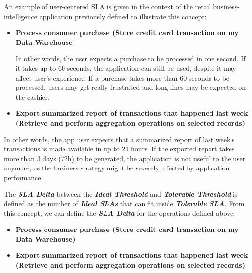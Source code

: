 An example of user-centered SLA is given in the context of the retail business-intelligence application previously defined to illustrate this concept: 

\begin{itemize}
\item{ 
\textbf{Process consumer purchase (Store credit card transaction on my Data Warehouse}
}

In other words, the user expects a purchase to be processed in one second. If it takes up to 60 seconds, the application can still be used, despite it may affect user's experience. If a purchase takes more than 60 seconds to be processed, users may get really frustrated and long lines may be expected on the cashier.

\item{
\textbf{Export summarized report of transactions that happened last week (Retrieve and perform aggregation operations on selected records) }
}
\end{itemize}
     
In other words, the app user expects that a summarized report of last week's transactions is made available in up to 24 hours. If the exported report takes more than 3 days (72h) to be generated, the application is not useful to the user anymore, as the business strategy might be severely affected by application performance.

The \textbf{\textit{SLA Delta}} between the \textbf{\textit{Ideal Threshold}} and \textbf{\textit{Tolerable Threshold}} is defined as the number of \textbf{\textit{Ideal SLAs}} that can fit inside \textbf{\textit{Tolerable SLA}}. From this concept, we can define the \textbf{\textit{SLA Delta}} for the operations defined above:

\begin{itemize}
\item{ 
\textbf{Process consumer purchase (Store credit card transaction on my Data Warehouse)}
}

\item{
\textbf{Export summarized report of transactions that happened last week (Retrieve and perform aggregation operations on selected records) }
}

\end{itemize}

